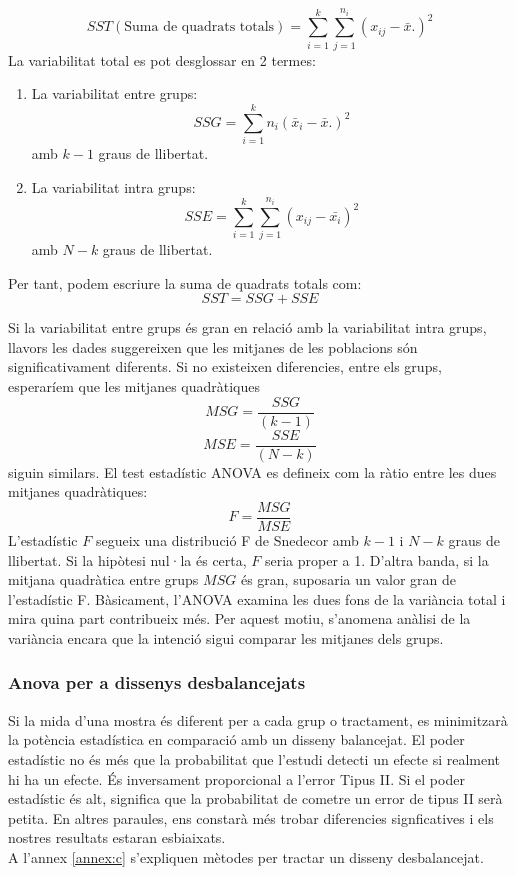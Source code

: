 \documentclass[english]{article}
\begin{document}
\begin{equation*}
SST(\text{Suma de quadrats totals}) = \sum_{i=1}^{k} \sum_{j=1}^{n_{i}} (x_{ij} - \bar{x}.)^2
\end{equation*}
La variabilitat total es pot desglossar en 2 termes:
\begin{enumerate}
\item La variabilitat entre grups:
\begin{equation*}
SSG = \sum_{i=1}^{k} n_{i}(\bar{x}_{i} - \bar{x}.)^2
\end{equation*}
amb $k-1$ graus de llibertat.
\item La variabilitat intra grups:
\begin{equation*}
SSE = \sum_{i=1}^{k} \sum_{j=1}^{n_{i}} (x_{ij} - \bar{x_{i}})^2
\end{equation*}
amb $N-k$ graus de llibertat.
\end{enumerate}
Per tant, podem escriure la suma de quadrats totals com:
\begin{equation*}
SST = SSG + SSE
\end{equation*}

Si la variabilitat entre grups és gran en relació amb la variabilitat intra grups, llavors les dades suggereixen que les mitjanes de les poblacions són significativament diferents. Si no existeixen diferencies, entre els grups, esperaríem que les mitjanes quadràtiques
\begin{equation*}
MSG = \frac{SSG}{(k-1)}
\end{equation*}
\begin{equation*}
MSE = \frac{SSE}{(N-k)}
\end{equation*}
siguin similars. El test estadístic ANOVA es defineix com la ràtio entre les dues mitjanes quadràtiques:
\begin{equation*}
F = \frac{MSG}{MSE}
\end{equation*}
L'estadístic $F$ segueix una distribució F de Snedecor amb $k-1$ i $N-k$ graus de llibertat. Si la hipòtesi nul·la és certa, $F$ seria proper a 1. D'altra banda, si la mitjana quadràtica entre grups $MSG$ és gran, suposaria un valor gran de l'estadístic F. Bàsicament, l'ANOVA examina les dues fons de la variància total i mira quina part contribueix més. Per aquest motiu, s'anomena anàlisi de la variància encara que la intenció sigui comparar les mitjanes dels grups.
\\

\subsubsection{Anova per a dissenys desbalancejats}
Si la mida d'una mostra és diferent per a cada grup o tractament, es minimitzarà la potència estadística en comparació amb un disseny balancejat. El poder estadístic no és més que la probabilitat que l'estudi detecti un efecte si realment hi ha un efecte. És inversament proporcional a l'error Tipus II. Si el poder estadístic és alt, significa que la probabilitat de cometre un error de tipus II serà petita. En altres paraules, ens constarà més trobar diferencies signficatives i els nostres resultats estaran esbiaixats.
\\
A l'annex \ref{annex:c} s'expliquen mètodes per tractar un disseny desbalancejat.
\end{document}
